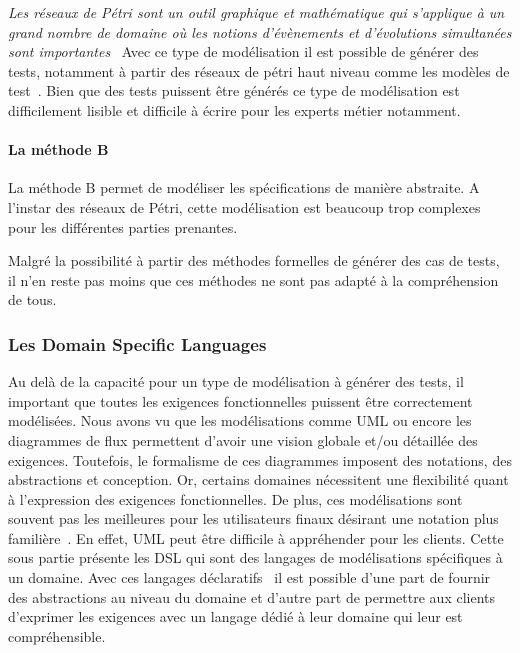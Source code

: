         \textit{\guillemotleft Les réseaux de Pétri sont un outil graphique et mathématique qui s’applique à un grand nombre de domaine où les notions d’évènements et d’évolutions simultanées sont importantes\guillemotright}~\cite{article14} Avec ce type de modélisation il est possible de générer des tests, notamment à partir des réseaux de pétri haut niveau comme les modèles de test~\cite{article15}. Bien que des tests puissent être générés ce type de modélisation est difficilement lisible et difficile à écrire pour les experts métier notamment. 
        
        \paragraph{La méthode B}
        
        La méthode B permet de modéliser les spécifications de manière  abstraite. A l'instar des réseaux de Pétri, cette modélisation est beaucoup trop complexes pour les différentes parties prenantes.
        
        Malgré la possibilité à partir des méthodes formelles de générer des cas de tests, il n'en reste pas moins que ces méthodes ne sont pas adapté à la compréhension de tous.
    
     \subsubsection{Les Domain Specific Languages}

        Au delà de la capacité pour un type de modélisation à générer des tests, il important que toutes les exigences fonctionnelles puissent être correctement modélisées. Nous avons vu que les modélisations comme UML ou encore les diagrammes de flux permettent d'avoir une vision globale et/ou détaillée des exigences. Toutefois, le formalisme de ces diagrammes imposent des notations, des abstractions et conception. Or, certains domaines nécessitent une flexibilité quant à l'expression des exigences fonctionnelles. De plus, ces modélisations sont souvent pas les meilleures pour les utilisateurs finaux désirant une notation plus familière~\cite{article3}. En effet, UML peut être difficile à appréhender pour les clients. Cette sous partie présente les DSL qui sont des langages de modélisations spécifiques à un domaine. Avec ces langages déclaratifs~\cite{article4} il est possible d'une part de fournir des abstractions au niveau du domaine et d'autre part de permettre aux clients d'exprimer les exigences avec un langage dédié à leur domaine qui leur est compréhensible.
    
